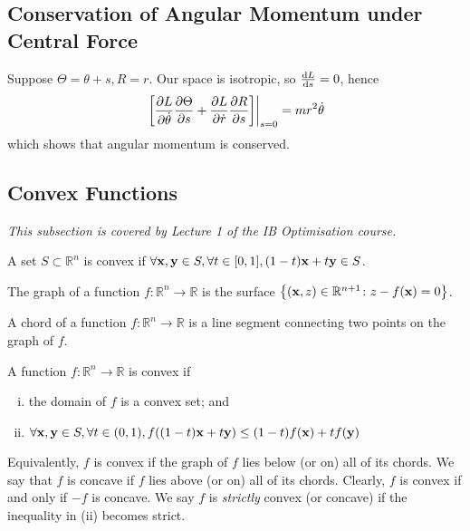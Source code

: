 \subsection{Conservation of Angular Momentum under Central Force}
\begin{example}
	Suppose \( \Theta = \theta + s, R = r \).
	Our space is isotropic, so \( \dv{L}{s} = 0 \), hence
	\[
		\eval{\qty[\pdv{L}{\dot\theta}\pdv{\Theta}{s} + \pdv{L}{\dot r}\pdv{R}{s}]}_{s=0} = mr^2\dot\theta
	\]
	which shows that angular momentum is conserved.
\end{example}

\subsection{Convex Functions}
\textit{This subsection is covered by Lecture 1 of the IB Optimisation course.}
\begin{definition}
	A set \( S \subset \mathbb R^n \) is convex if \( \forall \vb x, \vb y \in S, \forall t \in [0,1], (1-t)\vb x + t \vb y \in S \).
\end{definition}
\begin{definition}
	The graph of a function \( f \colon \mathbb R^n \to \mathbb R \) is the surface \( \qty{ (\vb x, z)\in \mathbb R^{n+1} \colon z - f(\vb x) = 0} \).
\end{definition}
\begin{definition}
	A chord of a function \( f \colon \mathbb R^n \to \mathbb R \) is a line segment connecting two points on the graph of \( f \).
\end{definition}
\begin{definition}
	A function \( f \colon \mathbb R^n \to \mathbb R \) is convex if
	\begin{enumerate}[(i)]
		\item the domain of \( f \) is a convex set; and
		\item \( \forall \vb x, \vb y \in S, \forall t \in (0,1), f((1-t)\vb x + t\vb y) \leq (1-t)f(\vb x) + tf(\vb y) \)
	\end{enumerate}
	Equivalently, \( f \) is convex if the graph of \( f \) lies below (or on) all of its chords.
	We say that \( f \) is concave if \( f \) lies above (or on) all of its chords.
	Clearly, \( f \) is convex if and only if \( -f \) is concave.
	We say \( f \) is \textit{strictly} convex (or concave) if the inequality in (ii) becomes strict.
\end{definition}
